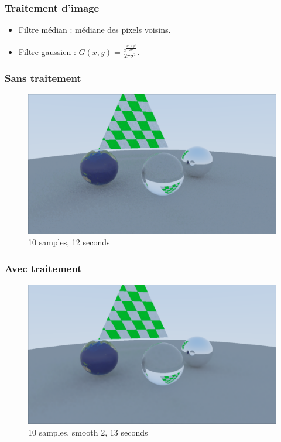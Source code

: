 \documentclass[handout]{beamer}
\begin{document}
\begin{frame}
    \frametitle{Traitement d'image}

    \begin{itemize}
        \item Filtre médian : médiane des pixels voisins.
        \item Filtre gaussien :
            $ G(x,y) = \frac{ e^{ \frac{x^2+y^2}{2 \sigma^2} } }{2 \pi \sigma^2} $.
    \end{itemize}

\end{frame}

\begin{frame}
    \frametitle{Sans traitement}

    \begin{figure}
        \includegraphics[scale=0.25]{traitement_off.png}
        \caption{10 samples, 12 seconds}
    \end{figure}

\end{frame}

\begin{frame}
    \frametitle{Avec traitement}

    \begin{figure}
        \includegraphics[scale=0.25]{traitement_on.png}
        \caption{10 samples, smooth 2, 13 seconds}
    \end{figure}

\end{frame}
\end{document}
